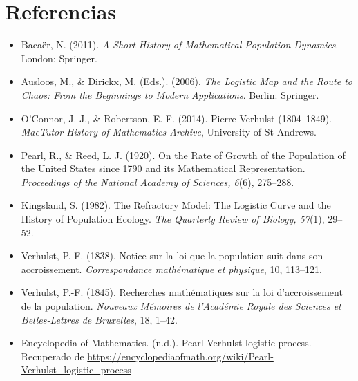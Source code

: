 \documentclass[12pt]{article}
\begin{document}
\section{Referencias}

\begin{itemize}
    \item Bacaër, N. (2011). \textit{A Short History of Mathematical Population Dynamics}. London: Springer.
    \item Ausloos, M., \& Dirickx, M. (Eds.). (2006). \textit{The Logistic Map and the Route to Chaos: From the Beginnings to Modern Applications}. Berlin: Springer.
    \item O'Connor, J. J., \& Robertson, E. F. (2014). Pierre Verhulst (1804–1849). \textit{MacTutor History of Mathematics Archive}, University of St Andrews.
    \item Pearl, R., \& Reed, L. J. (1920). On the Rate of Growth of the Population of the United States since 1790 and its Mathematical Representation. \textit{Proceedings of the National Academy of Sciences, 6}(6), 275–288.
    \item Kingsland, S. (1982). The Refractory Model: The Logistic Curve and the History of Population Ecology. \textit{The Quarterly Review of Biology, 57}(1), 29–52.
    \item Verhulst, P.-F. (1838). Notice sur la loi que la population suit dans son accroissement. \textit{Correspondance mathématique et physique}, 10, 113–121.
    \item Verhulst, P.-F. (1845). Recherches mathématiques sur la loi d’accroissement de la population. \textit{Nouveaux Mémoires de l’Académie Royale des Sciences et Belles-Lettres de Bruxelles}, 18, 1–42.
    \item Encyclopedia of Mathematics. (n.d.). Pearl-Verhulst logistic process. Recuperado de \url{https://encyclopediaofmath.org/wiki/Pearl-Verhulst_logistic_process}
\end{itemize}
\end{document}
